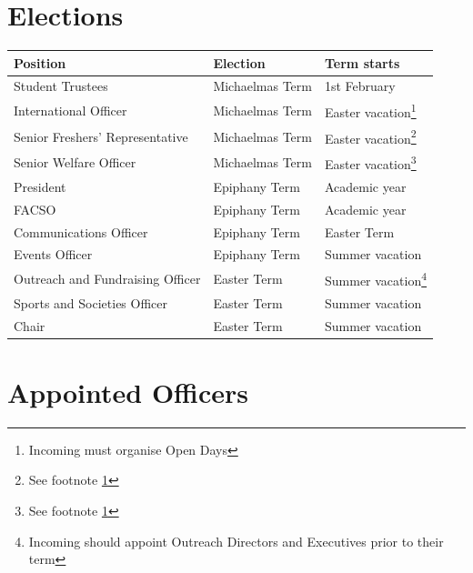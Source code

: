 \documentclass[12pt]{article}
\begin{document}
    \section{Elections}
    \begin{longtable}{|l|l|l|}
        \hline
        \textbf{Position} & \textbf{Election} & \textbf{Term starts} \\
        \hline\hline
        \endhead
        \hline
        \endfoot

        Student Trustees                        & Michaelmas Term           & 1st February \\
        International Officer                   & Michaelmas Term           & Easter vacation\footnote{\label{povds}Incoming must organise Open Days} \\
        Senior Freshers' Representative         & Michaelmas Term           & Easter vacation\footnote{See footnote \ref{povds}} \\
        Senior Welfare Officer                  & Michaelmas Term           & Easter vacation\footnote{See footnote \ref{povds}} \\

        President                               & Epiphany Term             & Academic year \\
        FACSO                                   & Epiphany Term             & Academic year \\
        Communications Officer                  & Epiphany Term             & Easter Term \\
        Events Officer                          & Epiphany Term             & Summer vacation \\
        
        Outreach and Fundraising Officer        & Easter Term               & Summer vacation\footnote{Incoming should appoint Outreach Directors and Executives prior to their term} \\
        Sports and Societies Officer            & Easter Term               & Summer vacation \\
        Chair                                   & Easter Term               & Summer vacation \\
    \end{longtable}


    \section{Appointed Officers}
\end{document}
